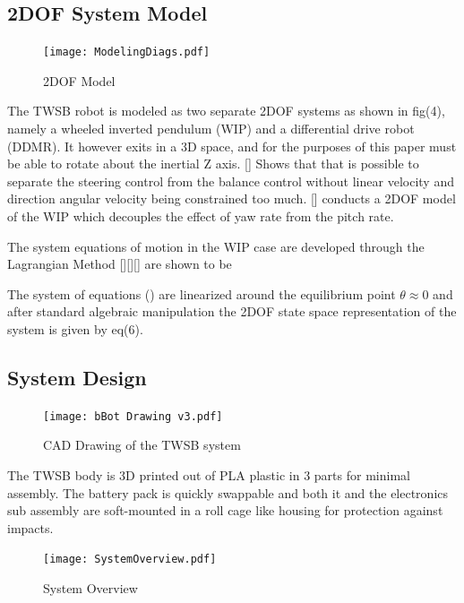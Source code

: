    \pagebreak{}

    \subsection{2DOF System Model}

    \begin{figure}[H]
        \texttt{[image: ModelingDiags.pdf]}
        \caption{2DOF Model}
    \end{figure}

    The TWSB robot is modeled as two separate 2DOF systems as shown in fig(4), 
    namely a wheeled inverted pendulum (WIP) and a differential drive robot (DDMR).
    It however exits in a 3D space, and for the purposes of this paper must be able to rotate about the inertial Z axis. 
    [] Shows that that is possible to separate the steering control from the balance control 
    without linear velocity and direction angular velocity being constrained too much. 
    [] conducts a 2DOF model of the WIP which  decouples the effect of yaw rate from the pitch rate. 

    The system equations of motion in the WIP case are developed through the Lagrangian Method [][][] are shown to be 
    
    The system of equations () are linearized around the equilibrium point $\theta\approx 0$  and after standard algebraic manipulation the 
    2DOF state space representation of the system is given by eq(6).


   
    \pagebreak{}

    \subsection{System Design}
        \begin{figure}[H]
            \texttt{[image: bBot Drawing v3.pdf]}
            \caption{CAD Drawing of the TWSB system}
        \end{figure}

        The TWSB body is 3D printed out of PLA plastic in 3 parts for minimal assembly.
        The battery pack is quickly swappable and both it and the electronics sub assembly 
        are soft-mounted in a roll cage like housing for protection against impacts. 
        \begin{figure}[H]
            \centering
            \texttt{[image: SystemOverview.pdf]}
            \caption{System Overview}
        \end{figure}

